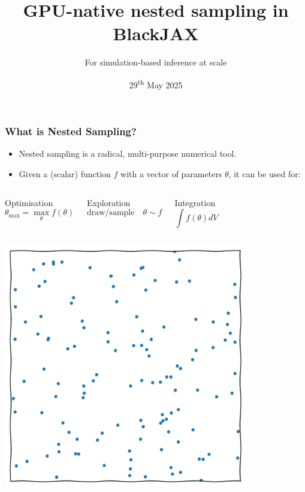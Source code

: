\documentclass[aspectratio=169]{beamer}
\title{GPU-native nested sampling in BlackJAX}
\subtitle{For simulation-based inference at scale}
\date{29\textsuperscript{th} May 2025}
\begin{document}
\begin{frame}
    \titlepage
\end{frame}

\begin{frame}
    \frametitle{What is Nested Sampling?}
    \begin{itemize}
        \item Nested sampling is a radical, multi-purpose numerical tool.
        \item Given a (scalar) function $f$ with a vector of parameters $\theta$, it can be used for:
    \end{itemize}
    \vspace{-10pt}
    \begin{columns}[t]
        \begin{block}{Optimisation}
            \[\theta_\text{max} = \max_\theta{f(\theta)}\]
        \end{block}
        \begin{block}{Exploration}
            \vspace{-10pt}
            \[\text{draw/sample}\quad \theta\sim f\]
            \vspace{-15pt}
        \end{block}
        \begin{block}{Integration}
            \[\int f(\theta) dV \]
        \end{block}
    \end{columns}
    \begin{columns}[t]
        \centerline{\includegraphics[width=0.8\textwidth,page=13]{figures/himmelblau}}

\end{columns}
\end{frame}
\end{document}
